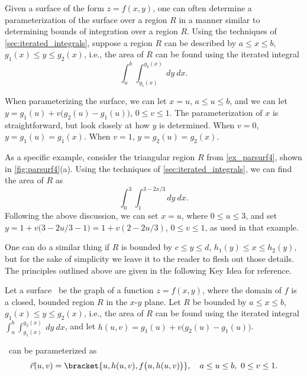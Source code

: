 Given a surface of the form $z=f(x,y)$, one can often determine a parameterization of the surface over a region $R$ in a manner similar to determining bounds of integration over a region $R$. Using the techniques of \autoref{sec:iterated_integrals}, suppose a region $R$ can be described by $a\leq x\leq b$, $g_1(x) \leq y\leq g_2(x)$, i.e., the area of $R$ can be found using the iterated integral
\[\int_a^b\int_{g_1(x)}^{g_2(x)}\ dy\ dx.\]

When parameterizing the surface, we can let $x=u$, $a\leq u\leq b$, and we can let $y = g_1(u)+v\bigl(g_2(u)-g_1(u)\bigr)$, $0\leq v\leq 1$. The parameterization of $x$ is straightforward, but look closely at how $y$ is determined. When $v=0$, $y=g_1(u) = g_1(x)$. When $v=1$, $y= g_2(u)=g_2(x)$. 

As a specific example, consider the triangular region $R$ from \autoref{ex_parsurf4}, shown in \autoref{fig:parsurf4}(a). Using the techniques of \autoref{sec:iterated_integrals}, we can find the area of $R$ as
\[\int_0^3\int_1^{3-2x/3} dy\ dx.\]
Following the above discussion, we can set $x=u$, where $0\leq u\leq 3$, and set $y = 1+ v\bigl(3-2u/3-1\bigr) = 1+v(2-2u/3)$, $0\leq v\leq 1$, as used in that example.

One can do a similar thing if $R$ is bounded by $c\leq y\leq d$, $h_1(y)\leq x\leq h_2(y)$, but for the sake of simplicity we leave it to the reader to flesh out those details. The principles outlined above are given in the following Key Idea for reference.

\begin{keyidea}\label{idea:parameterizing_surfaces}
Let a surface \surfaceS\ be the graph of a function $z=f(x,y)$, where the domain of $f$ is  a closed, bounded region $R$ in the $x$-$y$ plane. 
Let $R$ be bounded by $a\leq x\leq b$, $g_1(x)\leq y\leq g_2(x)$, i.e., the area of $R$ can be found using the iterated integral $\int_a^b\int_{g_1(x)}^{g_2(x)}\ dy\ dx$, and let $h(u,v) = g_1(u)+v\bigl(g_2(u)-g_1(u)\bigr)$. 

\surfaceS\ can be parameterized as 
\[
\vec r(u,v)
= \bracket{u, h(u,v), f\bigl(u,h(u,v)\bigr)},\quad a\leq u\leq b,\ 0\leq v\leq 1.
\]
\end{keyidea}


